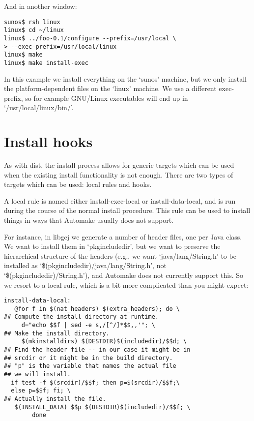 And in another window:

\begin{Verbatim}[frame=single]
sunos$ rsh linux
linux$ cd ~/linux
linux$ ../foo-0.1/configure --prefix=/usr/local \
> --exec-prefix=/usr/local/linux
linux$ make
linux$ make install-exec
\end{Verbatim}

In this example we install everything on the `sunos' machine, but we only 
install the platform-dependent files on the `linux' machine. We use a 
different exec-prefix, so for example GNU/Linux executables will end up 
in `/usr/local/linux/bin/'.

\section{Install hooks}

As with dist, the install process allows for generic targets which can be used when the existing install functionality is not enough. There are two types of targets which can be used: local rules and hooks.

A local rule is named either install-exec-local or install-data-local, and is run during the course of the normal install procedure. This rule can be used to install things in ways that Automake usually does not support.

For instance, in libgcj we generate a number of header files, one per Java 
class. We want to install them in `pkgincludedir', but we want to preserve 
the hierarchical structure of the headers (e.g., we want `java/lang/String.h' 
to be installed as `\$(pkgincludedir)/java/lang/String.h',
not `\$(pkgincludedir)/String.h'), and Automake does not currently 
support this. So we resort to a local rule, which is a bit more 
complicated than you might expect: 

\begin{Verbatim}[frame=single]
install-data-local:
   @for f in $(nat_headers) $(extra_headers); do \
## Compute the install directory at runtime.
     d="echo $$f | sed -e s,/[^/]*$$,,'"; \
## Make the install directory.
     $(mkinstalldirs) $(DESTDIR)$(includedir)/$$d; \
## Find the header file -- in our case it might be in 
## srcdir or it might be in the build directory.
## "p" is the variable that names the actual file 
## we will install.
  if test -f $(srcdir)/$$f; then p=$(srcdir)/$$f;\
  else p=$$f; fi; \
## Actually install the file.
   $(INSTALL_DATA) $$p $(DESTDIR)$(includedir)/$$f; \
        done
\end{Verbatim}

